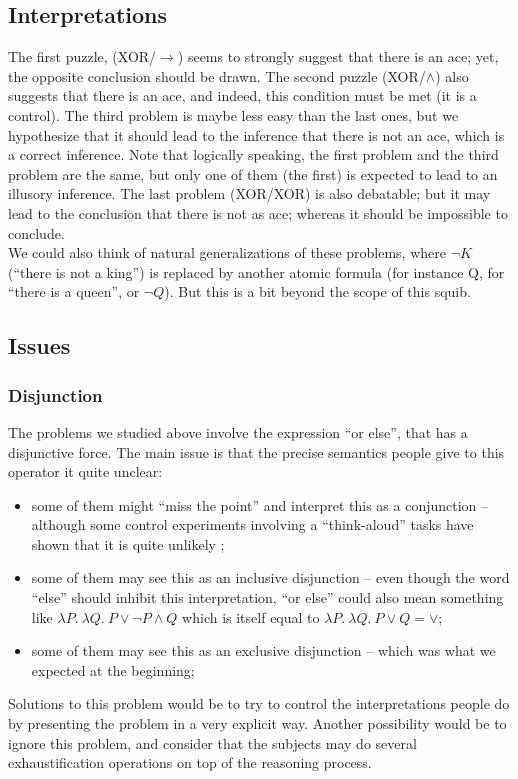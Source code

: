 \documentclass[french]{article}
\begin{document}
\subsection{Interpretations}
The first puzzle, (XOR/$\rightarrow$) seems to strongly suggest that there is an ace; yet, the opposite conclusion should be drawn. The second puzzle (XOR/$\wedge$) also suggests that there is an ace, and  indeed, this condition must be met (it is a control). The third problem is maybe less easy than the last ones, but we hypothesize that it should lead to the inference that there is not an ace, which is a correct inference. Note that logically speaking, the first problem and the third problem are the same, but only one of them (the first) is expected to lead to an illusory inference. The last problem (XOR/XOR) is also debatable; but it may lead to the conclusion that there is not as ace; whereas it should be impossible to conclude.\\
We could also think of natural generalizations of these problems, where $\neg K$ (``there is not a king'') is replaced by another atomic formula (for instance Q, for ``there is a queen'', or $\neg Q$). But this is a bit beyond the scope of this squib.
\subsection{Issues}
\subsubsection{Disjunction}
The problems we studied above involve the expression ``or else'', that has a disjunctive force. The main issue is that the precise semantics people give to this operator it quite unclear:
\begin{itemize}
	\item some of them might ``miss the point'' and interpret this as a conjunction -- although some control experiments involving a ``think-aloud'' tasks have shown that it is quite unlikely \cite{johnsonlaird1999};
	\item some of them may see this as an inclusive disjunction -- even though the word ``else'' should inhibit this interpretation, ``or else'' could also mean something like $\lambda P. \ \lambda Q. \ P \vee \neg P \wedge Q $ which is itself equal to $\lambda P. \ \lambda Q. \ P \vee Q = \vee$;
	\item some of them may see this as an exclusive disjunction -- which was what we expected at the beginning;
\end{itemize} 
Solutions to this problem would be to try to control the interpretations people do by presenting the problem in a very explicit way. Another possibility would be to ignore this problem, and consider that the subjects may do several exhaustification operations on top of the reasoning process.
\end{document}
